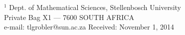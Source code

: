 \documentclass[twoside,reqno,11pt]{fcaa-var} %
\begin{document}
\begin{thebibliography}{99}








\end{thebibliography} %


 \bigskip \smallskip

 \it

 \noindent
$^1$ Dept. of Mathematical Sciences, Stellenbosch University \\
Private Bag X1 --- 7600 SOUTH AFRICA \\[4pt]
  e-mail: tlgrobler@sun.ac.za
\hfill Received: November 1, 2014 \\[12pt]
\end{document}

